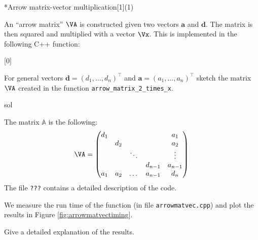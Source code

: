 
\begin{samproblem}*{}{Arrow matrix-vector multiplication}[1](1){
    An ``arrow matrix'' $\VA$ is constructed given two vectors $\mathbf{a}$ and $\mathbf{d}$.
    The matrix is then squared and multiplied with a vector $\Vx$. This is implemented in the
    following C++ function:

[0]

}

\begin{subproblem}{}

  For general vectors $\mathbf{d} = (d_1, \dots, d_n)^\top$ and $\mathbf{a} = (a_1, \dots, a_n)^\top$
  sketch the matrix $\VA$ created in the function \verb|arrow_matrix_2_times_x|.

  \begin{samwriteprbpart}{sol}
  \begin{samsolution}
    The matrix $\mathbb{A}$ is the following:
    \begin{align}
    \VA=\begin{pmatrix}
      d_1 &     &        &         & a_1     \\
          & d_2 &        &         & a_2     \\
          &     & \ddots &         & \vdots  \\
          &     &        & d_{n-1} & a_{n-1} \\
      a_1 & a_2 & \dots  & a_{n-1} & d_n     \\
    \end{pmatrix}
    \end{align}
    The file \texttt{???} contains a detailed description of the code.
  \end{samsolution}
\end{samwriteprbpart}
\end{subproblem}

\begin{subproblem}
  We measure the run time of the function \texttt{} (in file \texttt{arrowmatvec.cpp})
  and plot the results in Figure \ref{fig:arrowmatvectiming}.

  Give a detailed explanation of the results.



\end{subproblem}
\end{samproblem}
